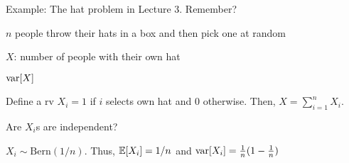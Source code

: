 \begin{frame}{Example: The hat problem in Lecture 3. Remember?}

\bigskip

{
\small
\plitemsep 0.05in
\bci

\item $n$ people throw their hats in a box and then pick one at random

\item $X$: number of people with their own hat

\item {} $\text{var}[ X ]$

\item {} Define a rv $X_i=1$ if $i$ selects own hat and $0$ otherwise. Then, $X = \sum_{i=1}^n X_i.$

\item {} Are $X_i$s are independent?

\medskip
\item<2-> $X_i \sim \text{Bern}(1/n).$ Thus, $\mathbb{E}[ X_i ] = 1/n$ and $\text{var}[ X_i ] = \frac{1}{n}(1-\frac{1}{n})$

\eci
}
{
\small
\plitemsep 0.01in
\bci [$\circ$]
\item {}
\setlength{\jot}{0pt}
\vspace{-0.2in}
\vspace{-0.1in}

\eci

}
\end{frame}

